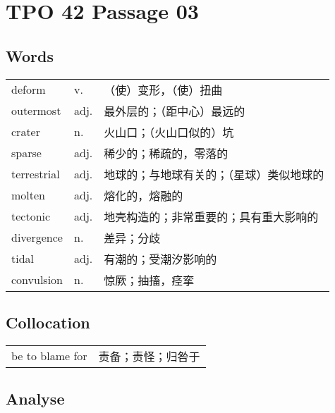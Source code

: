 \section{TPO 42 Passage 03}

\subsection{Words}

\begin{tabular}{lll}
    deform      & v.   & （使）变形，（使）扭曲          \\
    outermost   & adj. & 最外层的；（距中心）最远的        \\
    crater      & n.   & 火山口；（火山口似的）坑         \\
    sparse      & adj. & 稀少的；稀疏的，零落的          \\
    terrestrial & adj. & 地球的；与地球有关的；（星球）类似地球的 \\
    molten      & adj. & 熔化的，熔融的              \\
    tectonic    & adj. & 地壳构造的；非常重要的；具有重大影响的  \\
    divergence  & n.   & 差异；分歧                \\
    tidal       & adj. & 有潮的；受潮汐影响的           \\
    convulsion  & n.   & 惊厥；抽搐，痉挛             \\
\end{tabular}

\subsection{Collocation}

\begin{tabular}{ll}
    be to blame for & 责备；责怪；归咎于 \\
\end{tabular}

\newpage

\subsection{Analyse}

